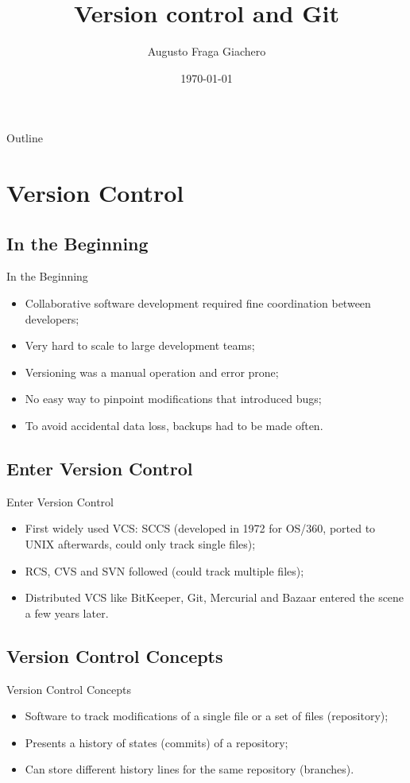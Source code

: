 \documentclass{beamer}
\title{Version control and Git}
\author{Augusto Fraga Giachero}
\date{\today}
\begin{document}
\begin{frame}
  \titlepage 
\end{frame}

\begin{frame}{Outline}
  \tableofcontents
\end{frame}

\section{Version Control}

\subsection{In the Beginning}
\begin{frame}{In the Beginning}
  \begin{itemize}
    \item Collaborative software development required fine coordination between developers;
    \item Very hard to scale to large development teams;
    \item Versioning was a manual operation and error prone;
    \item No easy way to pinpoint modifications that introduced bugs;
    \item To avoid accidental data loss, backups had to be made often.
  \end{itemize}
\end{frame}

\subsection{Enter Version Control}
\begin{frame}{Enter Version Control}
  \begin{itemize}
    \item First widely used VCS: SCCS (developed in 1972 for OS/360, ported to UNIX afterwards, could only track single files);
    \item RCS, CVS and SVN followed (could track multiple files);
    \item Distributed VCS like BitKeeper, Git, Mercurial and Bazaar entered the scene a few years later.
  \end{itemize}
\end{frame}

\subsection{Version Control Concepts}
\begin{frame}{Version Control Concepts}
  \begin{itemize}
    \item Software to track modifications of a single file or a set of files (repository);
    \item Presents a history of states (commits) of a repository;
    \item Can store different history lines for the same repository (branches).
  \end{itemize}
\end{frame}
\end{document}
